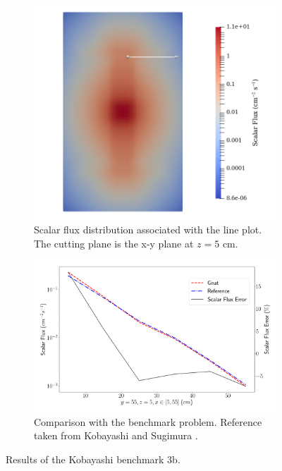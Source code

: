 \begin{figure}[H]
    \centering
    \begin{subfigure}[b]{0.4\textwidth}
        \centering
        \includegraphics[width=\textwidth]{images/verification/sn_kobayashi/3/kobayashi_3b_flux_map.png}
        \caption{Scalar flux distribution associated with the line plot. The cutting plane is the x-y plane at $z = 5\text{ cm}$.}
        \label{fig:verification:sn_kobayashi_3b:flux}
    \end{subfigure}
    \hfill
    \begin{subfigure}[b]{0.59\textwidth}
        \centering
        \includegraphics[width=\textwidth]{images/verification/sn_kobayashi/3/kobayashi_3b.png}
        \caption{Comparison with the benchmark problem. Reference taken from Kobayashi and Sugimura \cite{kobayashi_benchmarks}.}
        \label{fig:verification:sn_kobayashi_3b:line_plot}
    \end{subfigure}
    \caption{Results of the Kobayashi benchmark 3b.}
    \label{fig:verification:sn_kobayashi_3b}
\end{figure}

